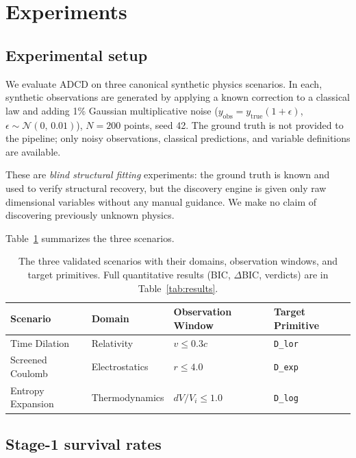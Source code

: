 ﻿\documentclass{article}
\begin{document}
\section{Experiments}

\subsection{Experimental setup}

We evaluate ADCD on three canonical synthetic physics scenarios.
In each, synthetic observations are generated by applying a known correction to
a classical law and adding 1\% Gaussian multiplicative noise
($y_\mathrm{obs} = y_\mathrm{true}(1 + \epsilon)$, $\epsilon \sim \mathcal{N}(0,\, 0.01)$),
$N = 200$ points, seed 42.
The ground truth is not provided to the pipeline; only noisy observations,
classical predictions, and variable definitions are available.

These are \emph{blind structural fitting} experiments: the ground truth is known and
used to verify structural recovery, but the discovery engine is given only raw dimensional variables without any manual guidance.
We make no claim of discovering previously unknown physics.

Table~\ref{tab:scenarios} summarizes the three scenarios.

\begin{table}[ht]
\small
\caption{The three validated scenarios with their domains, observation windows, and target primitives.
Full quantitative results (BIC, $\Delta$BIC, verdicts) are in Table~\ref{tab:results}.}
\label{tab:scenarios}
\centering
\begin{tabular}{@{}llll@{}}
\toprule
Scenario & Domain & Observation Window & Target Primitive \\
\midrule
Time Dilation     & Relativity     & $v \le 0.3c$          & \texttt{D\_lor} \\
Screened Coulomb  & Electrostatics & $r \le 4.0$           & \texttt{D\_exp} \\
Entropy Expansion & Thermodynamics & $dV/V_i \le 1.0$     & \texttt{D\_log} \\
\bottomrule
\end{tabular}
\end{table}

\subsection{Stage-1 survival rates}
\end{document}
